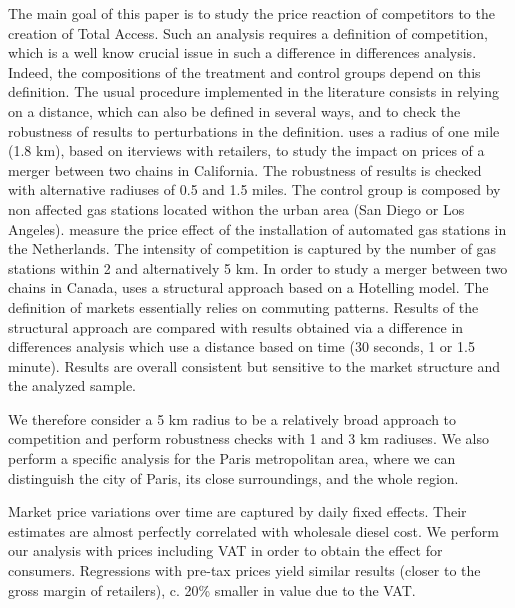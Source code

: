 \documentclass[english]{article}
\begin{document}
\medskip{}

The main goal of this paper is to study the price reaction of competitors to the creation of Total Access. Such an analysis requires a definition of competition, which is a well know crucial issue in such a difference in differences analysis. Indeed, the compositions of the treatment and control groups depend on this definition. The usual procedure implemented in the literature consists in relying on a distance, which can also be defined in several ways, and to check the robustness of results to perturbations in the definition. \cite{HAS04} uses a radius of one mile (1.8 km), based on iterviews with retailers, to study the impact on prices of a merger between two chains in California. The robustness of results is checked with alternative radiuses of 0.5 and 1.5 miles. The control group is composed by non affected gas stations located withon the urban area (San Diego or Los Angeles). \cite{BRU15} measure the price effect of the installation of automated gas stations in the Netherlands. The intensity of competition is captured by the number of gas stations within 2 and alternatively 5 km. In order to study a merger between two chains in Canada, \cite{HOU12} uses a structural approach based on a Hotelling model. The definition of markets essentially relies on commuting patterns. Results of the structural approach are compared with results obtained via a difference in differences analysis which use a distance based on time (30 seconds, 1 or 1.5 minute). Results are overall consistent but sensitive to the market structure and the analyzed sample.

We therefore consider a 5 km radius to be a relatively broad approach to competition and perform robustness checks with 1 and 3 km radiuses. We also perform a specific analysis for the Paris metropolitan area, where we can distinguish the city of Paris, its close surroundings, and the whole region.

Market price variations over time are captured by daily fixed effects. Their estimates are almost perfectly correlated with wholesale diesel cost. We perform our analysis with prices including VAT in order to obtain the effect for consumers. Regressions with pre-tax prices yield similar results (closer to the gross margin of retailers), c. 20\% smaller in value due to the VAT.
\medskip{}
\end{document}
